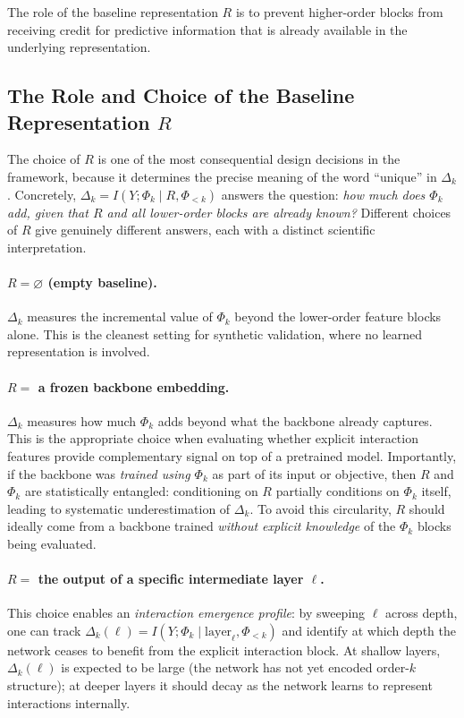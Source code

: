 \documentclass[11pt]{article}
\newcommand{\1}{\mathbf{1}}
\begin{document}
The role of the baseline representation $R$ is to prevent higher-order blocks from receiving credit
for predictive information that is already available in the underlying representation.

\subsection{The Role and Choice of the Baseline Representation $R$}

The choice of $R$ is one of the most consequential design decisions in the framework, because it
determines the precise meaning of the word ``unique'' in $\Delta_k$.
Concretely, $\Delta_k = I(Y;\Phi_k \mid R,\Phi_{<k})$ answers the question:
\emph{how much does $\Phi_k$ add, given that $R$ and all lower-order blocks are already known?}
Different choices of $R$ give genuinely different answers, each with a distinct scientific
interpretation.

\paragraph{$R = \varnothing$ (empty baseline).}
$\Delta_k$ measures the incremental value of $\Phi_k$ beyond the lower-order feature blocks alone.
This is the cleanest setting for synthetic validation, where no learned representation is
involved.

\paragraph{$R = $ a frozen backbone embedding.}
$\Delta_k$ measures how much $\Phi_k$ adds beyond what the backbone already captures.
This is the appropriate choice when evaluating whether explicit interaction features provide
complementary signal on top of a pretrained model.
Importantly, if the backbone was \emph{trained using $\Phi_k$} as part of its input or objective,
then $R$ and $\Phi_k$ are statistically entangled: conditioning on $R$ partially conditions on
$\Phi_k$ itself, leading to systematic underestimation of $\Delta_k$.
To avoid this circularity, $R$ should ideally come from a backbone trained
\emph{without explicit knowledge} of the $\Phi_k$ blocks being evaluated.

\paragraph{$R = $ the output of a specific intermediate layer $\ell$.}
This choice enables an \emph{interaction emergence profile}: by sweeping $\ell$ across depth, one
can track $\Delta_k(\ell) = I(Y;\Phi_k \mid \text{layer}_\ell,\Phi_{<k})$ and identify at which
depth the network ceases to benefit from the explicit interaction block.
At shallow layers, $\Delta_k(\ell)$ is expected to be large (the network has not yet encoded
order-$k$ structure); at deeper layers it should decay as the network learns to represent
interactions internally.
\end{document}

